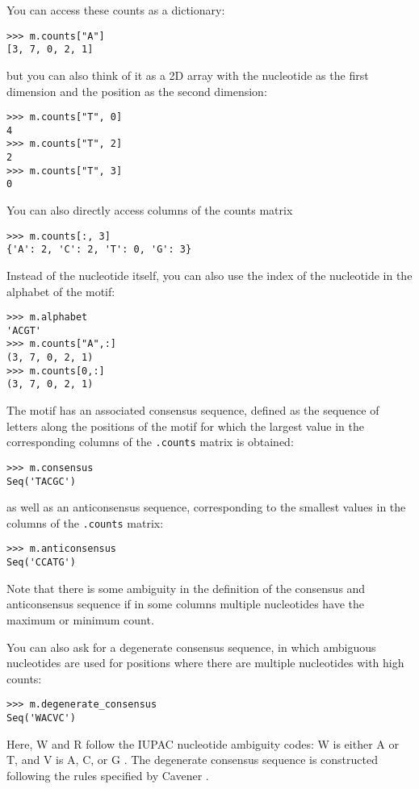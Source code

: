 You can access these counts as a dictionary:
\begin{verbatim}
>>> m.counts["A"]
[3, 7, 0, 2, 1]
\end{verbatim}
but you can also think of it as a 2D array with the nucleotide as the first
dimension and the position as the second dimension:
\begin{verbatim}
>>> m.counts["T", 0]
4
>>> m.counts["T", 2]
2
>>> m.counts["T", 3]
0
\end{verbatim}
You can also directly access columns of the counts matrix
\begin{verbatim}
>>> m.counts[:, 3]
{'A': 2, 'C': 2, 'T': 0, 'G': 3}
\end{verbatim}
Instead of the nucleotide itself, you can also use the index of the nucleotide
in the alphabet of the motif:
\begin{verbatim}
>>> m.alphabet
'ACGT'
>>> m.counts["A",:]
(3, 7, 0, 2, 1)
>>> m.counts[0,:]
(3, 7, 0, 2, 1)
\end{verbatim}
The motif has an associated consensus sequence, defined as the sequence of
letters along the positions of the motif for which the largest value in the
corresponding columns of the \verb+.counts+ matrix is obtained:
\begin{verbatim}
>>> m.consensus
Seq('TACGC')
\end{verbatim}
as well as an anticonsensus sequence, corresponding to the smallest values in
the columns of the \verb+.counts+ matrix:
\begin{verbatim}
>>> m.anticonsensus
Seq('CCATG')
\end{verbatim}
Note that there is some ambiguity in the definition of the consensus and anticonsensus sequence if in some columns multiple nucleotides have the maximum or minimum count.

You can also ask for a degenerate consensus sequence, in which ambiguous
nucleotides are used for positions where there are multiple nucleotides with
high counts:
\begin{verbatim}
>>> m.degenerate_consensus
Seq('WACVC')
\end{verbatim}
Here, W and R follow the IUPAC nucleotide ambiguity codes: W is either A or T,
and V is A, C, or G \cite{cornish1985}. The degenerate consensus sequence is
constructed following the rules specified by Cavener \cite{cavener1987}.

